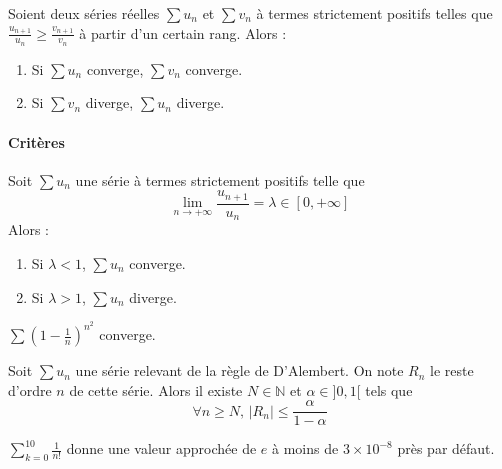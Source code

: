 
  \begin{proposition}
    Soient deux séries réelles $\sum u_n$ et $\sum v_n$ à termes strictement positifs telles que $\frac{u_{n+1}}{u_n} \geq \frac{v_{n+1}}{v_n}$ à partir d'un certain rang. Alors :
    \begin{enumerate}[label={\bfseries(\roman*)}]
      \item Si $\sum u_n$ converge, $\sum v_n$ converge.
      \item Si $\sum v_n$ diverge, $\sum u_n$ diverge.
    \end{enumerate}
  \end{proposition}

  \paragraph{Critères}

  \begin{proposition}
    Soit $\sum u_n$ une série à termes strictement positifs telle que
    \[ \lim_{n \rightarrow +\infty} \frac{u_{n+1}}{u_n} = \lambda \in [0, +\infty] \]
    Alors :
    \begin{enumerate}[label={\bfseries(\roman*)}]
      \item Si $\lambda < 1$, $\sum u_n$ converge.
      \item Si $\lambda > 1$, $\sum u_n$ diverge.
    \end{enumerate}
  \end{proposition}


  \begin{example}
    $\sum \left( 1 - \frac{1}{n} \right)^{n^2}$ converge.
  \end{example}


  \begin{proposition}
    Soit $\sum u_n$ une série relevant de la règle de D'Alembert. On note $R_n$ le reste d'ordre $n$ de cette série. Alors il existe $N \in \mathbb{N}$ et $\alpha \in ]0,1[$ tels que
    \[ \forall n \geq N, \, |R_n| \leq \frac{\alpha}{1-\alpha} \]
  \end{proposition}

  \begin{example}
    $\sum_{k=0}^{10} \frac{1}{n!}$ donne une valeur approchée de $e$ à moins de $3 \times 10^{-8}$ près par défaut.
  \end{example}

